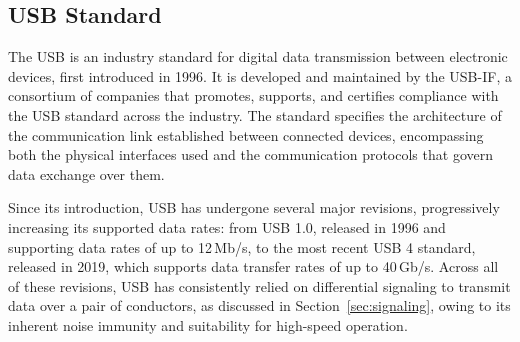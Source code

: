 
\subsection{\acs{USB} Standard}\label{subsec:usb_standard}
    
The \ac{USB} is an industry standard for digital data transmission between electronic devices, first introduced in 1996. It is developed and maintained by the \ac{USB-IF}, a consortium of companies that promotes, supports, and certifies compliance with the \ac{USB} standard across the industry. The standard specifies the architecture of the communication link established between connected devices, encompassing both the physical interfaces used and the communication protocols that govern data exchange over them.

Since its introduction, \ac{USB} has undergone several major revisions, progressively increasing its supported data rates: from \ac{USB} 1.0, released in 1996 and supporting data rates of up to 12\,Mb/s, to the most recent \ac{USB} 4 standard, released in 2019, which supports data transfer rates of up to 40\,Gb/s. Across all of these revisions, \ac{USB} has consistently relied on differential signaling to transmit data over a pair of conductors, as discussed in Section~\ref{sec:signaling}, owing to its inherent noise immunity and suitability for high-speed operation.

